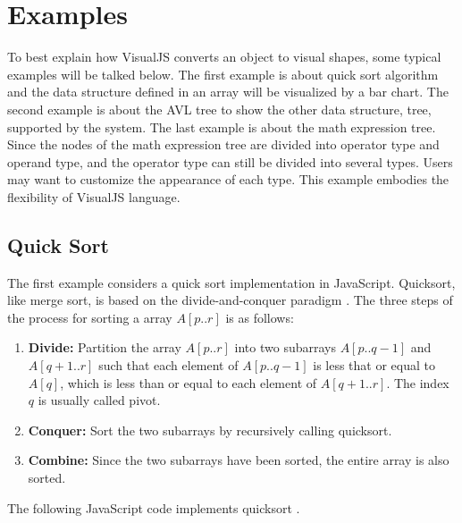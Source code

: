 \chapter {Examples}
\label {Examples}

To best explain how VisualJS converts an object to visual shapes, some typical examples will be talked below. The first example is about quick sort algorithm and the data structure defined in an array will be visualized by a bar chart. The second example is about the AVL tree to show the other data structure, tree, supported by the system. The last example is about the math expression tree. Since the nodes of the math expression tree are divided into operator type and operand type, and the operator type can still be divided into several types. Users may want to customize the appearance of each type. This example embodies the flexibility of VisualJS language.

\section {Quick Sort}

The first example considers a quick sort implementation in JavaScript. Quicksort, like merge sort, is based on the divide-and-conquer paradigm \cite{Cormen:2001:IA:580470}. The three steps of the process for sorting a array $A[p..r]$ is as follows:

\begin {enumerate}
\item \textbf{Divide:} Partition the array $A[p..r]$ into two subarrays $A[p..q-1]$ and $A[q+1..r]$ such that each element of $A[p..q-1]$ is less that or equal to $A[q]$, which is less than or equal to each element of $A[q+1..r]$. The index $q$ is usually called pivot.
\item \textbf{Conquer:} Sort the two subarrays by recursively calling quicksort.
\item \textbf{Combine:} Since the two subarrays have been sorted, the entire array is also sorted. 
\end {enumerate}

The following JavaScript code implements quicksort \cite{1981455}.

